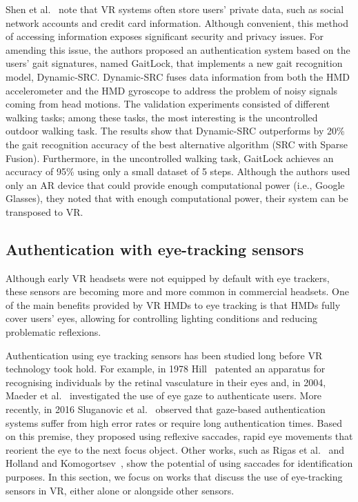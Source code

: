 \documentclass[journal]{IEEEtran}
\begin{document}
Shen et al.~\cite{shen2018} note that VR systems often store users' private data, such as social network accounts and credit card information. Although convenient, this method of accessing information exposes significant security and privacy issues. For amending this issue, the authors proposed an authentication system based on the users' gait signatures, named GaitLock, that implements a new gait recognition model, Dynamic-SRC. Dynamic-SRC fuses data information from both the HMD accelerometer and the HMD gyroscope to address the problem of noisy signals coming from head motions. The validation experiments consisted of different walking tasks; among these tasks, the most interesting is the uncontrolled outdoor walking task. The results show that Dynamic-SRC outperforms by 20\% the gait recognition accuracy of the best alternative algorithm (SRC with Sparse Fusion). Furthermore, in the uncontrolled walking task, GaitLock achieves an accuracy of 95\% using only a small dataset of 5 steps. Although the authors used only an AR device that could provide enough computational power (i.e., Google Glasses), they noted that with enough computational power, their system can be transposed to VR. 


\subsection{Authentication with eye-tracking sensors}
Although early VR headsets were not equipped by default with eye trackers, these sensors are becoming more and more common in commercial headsets. One of the main benefits provided by VR HMDs to eye tracking is that HMDs fully cover users' eyes, allowing for controlling lighting conditions and reducing problematic reflexions.

Authentication using eye tracking sensors has been studied long before VR technology took hold. For example, in 1978 Hill~\cite{hill1978} patented an apparatus for recognising individuals by the retinal vasculature in their eyes and, in 2004, Maeder et al.~\cite{maeder2004} investigated the use of eye gaze to authenticate users. 
More recently, in 2016 Sluganovic et al.~\cite{sluganovic2016} observed that gaze-based authentication systems suffer from high error rates or require long authentication times. Based on this premise, they proposed using reflexive saccades, rapid eye movements that reorient the eye to the next focus object. %
Other works, such as Rigas et al.~\cite{rigas2016} and Holland and Komogortsev~\cite{corey2013}, show the potential of using saccades for identification purposes. In this section, we focus on works that discuss the use of eye-tracking sensors in VR, either alone or alongside other sensors. 
\end{document}
